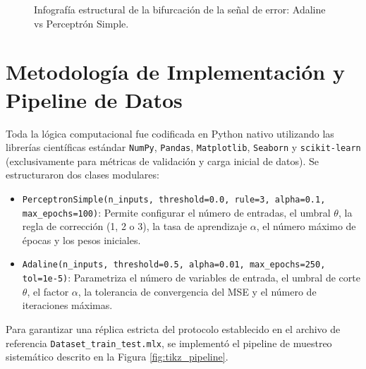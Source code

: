 \documentclass{article}
\begin{document}
\begin{figure}[H]
\caption{Infografía estructural de la bifurcación de la señal de error: Adaline vs Perceptrón Simple.}
\label{fig:tikz_bifurcacion}
\end{figure}

\section{Metodología de Implementación y Pipeline de Datos}
Toda la lógica computacional fue codificada en Python nativo utilizando las librerías científicas estándar \texttt{NumPy}, \texttt{Pandas}, \texttt{Matplotlib}, \texttt{Seaborn} y \texttt{scikit-learn} (exclusivamente para métricas de validación y carga inicial de datos). Se estructuraron dos clases modulares:
\begin{itemize}
    \item \texttt{PerceptronSimple(n\_inputs, threshold=0.0, rule=3, alpha=0.1, max\_epochs=100)}: Permite configurar el número de entradas, el umbral $\theta$, la regla de corrección (1, 2 o 3), la tasa de aprendizaje $\alpha$, el número máximo de épocas y los pesos iniciales.
    \item \texttt{Adaline(n\_inputs, threshold=0.5, alpha=0.01, max\_epochs=250, tol=1e-5)}: Parametriza el número de variables de entrada, el umbral de corte $\theta$, el factor $\alpha$, la tolerancia de convergencia del MSE y el número de iteraciones máximas.
\end{itemize}

Para garantizar una réplica estricta del protocolo establecido en el archivo de referencia \texttt{Dataset\_train\_test.mlx}, se implementó el pipeline de muestreo sistemático descrito en la Figura \ref{fig:tikz_pipeline}.
\end{document}

